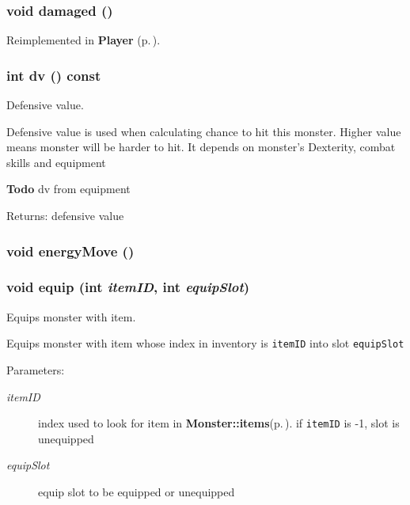 \subsubsection{\setlength{\rightskip}{0pt plus 5cm}void damaged ()\hspace{0.3cm}{\tt  [virtual]}}\label{classMonster_a35}




Reimplemented in {\bf Player} {\rm (p.\,\pageref{classPlayer_a8})}.
\subsubsection{\setlength{\rightskip}{0pt plus 5cm}int dv () const}\label{classMonster_a15}


Defensive value. 

Defensive value is used when calculating chance to hit this monster. Higher value means monster will be harder to hit. It depends on monster's Dexterity, combat skills and equipment

\begin{Desc}
\item[{\bf Todo}]dv from equipment\end{Desc}
\begin{Desc}
\item[Returns:]defensive value\end{Desc}
\subsubsection{\setlength{\rightskip}{0pt plus 5cm}void energy\-Move ()}\label{classMonster_a9}


\subsubsection{\setlength{\rightskip}{0pt plus 5cm}void equip (int {\em item\-ID}, int {\em equip\-Slot})}\label{classMonster_a19}


Equips monster with item. 

Equips monster with item whose index in inventory is {\tt item\-ID} into slot {\tt equip\-Slot} 

\begin{Desc}
\item[Parameters:]
\begin{description}
\item[{\em item\-ID}]index used to look for item in {\bf Monster::items}{\rm (p.\,\pageref{classMonster_o1})}. if {\tt item\-ID} is -1, slot is unequipped\item[{\em equip\-Slot}]equip slot to be equipped or unequipped\end{description}
\end{Desc}

